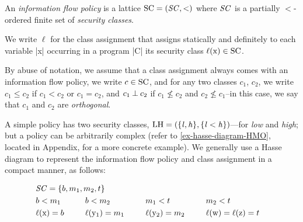 \begin{definition}\label{def:ifp} An \emph{information flow policy} is a lattice \(\mathrm{SC}
= (\mathit{SC}, <)\) where \(\mathit{SC}\) is a partially \(<\)-ordered finite set of
\emph{security classes}.

We write \(\ell\) for the class assignment that assigns statically and
definitely to each variable \prc|x| occurring in a program \prc|C| its security
class \(\lvl{\prc|x|} \in \SC\). \end{definition}

By abuse of notation, we assume that a class assignment always comes with an
information flow policy, we write \(c \in \mathrm{SC}\), and for any two classes
\(c_1\), \(c_2\), we write \(c_1 \leqslant c_2\) if \(c_1 < c_2\) or \(c_1 =
c_2\), and \(c_1 \mathbin{\bot} c_2\) if  \(c_1 \nleqslant c_2\) and \(c_2 \nleqslant
c_1\)--in this case, we say that \(c_1\) and \(c_2\) are \emph{orthogonal}.

A simple policy has two security classes, \eg \(\mathrm{LH}=(\{\mathit{l}, \mathit{h}\},
\{\mathit{l} < \mathit{h}\})\)---for \emph{low} and \emph{high}; but a policy can be
arbitrarily complex (refer to \autoref{ex-hasse-diagram-HMO}, located in
Appendix, for a more concrete example). We generally use a Hasse diagram to
represent the information flow policy and class assignment in a compact manner,
as follows:

\begin{center}
\begin{minipage}{.68\textwidth}
\begin{alignat*}{7}
& \SCset = \{b, m_1, m_2, t\} \span \span \\ %
& b < m_1 & \hspace{1.6em} & b < m_2 & \hspace{1.6em} & m_1 < t &\hspace{1.6em} & m_2 < t\\
& \lvl{\prc|x|} = b && \lvl{\prc|y$_1$|} = m_1 && \lvl{\prc|y$_2$|}= m_2 && \lvl{\prc|w|} =  \lvl{\prc|z|}  = t
\end{alignat*}
\end{minipage}\hfill%
\begin{minipage}{.3\textwidth}\hfill%
\end{minipage}
\end{center}

